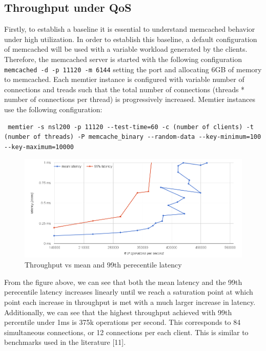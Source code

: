 \subsection{Throughput under QoS}
Firstly, to establish a baseline it is essential to understand memcached behavior under high utilization. In order to establish this baseline, a default configuration of memcached will be used with a variable workload generated by the clients. Therefore, the memcached server is started with the following configuration \texttt{memcached -d -p 11120 -m 6144} setting the port and allocating 6GB of memory to memcached. Each memtier instance is configured with variable number of connections and treads such that the total number of connections (threads * number of connections per thread) is progressively increased. Memtier instances use the following configuration:
\begin{verbatim} memtier -s nsl200 -p 11120 --test-time=60 -c (number of clients) -t (number of threads) -P memcache_binary --random-data --key-minimum=100 --key-maximum=10000 \end{verbatim}

\begin{figure}[h]
    \includegraphics[width=\textwidth]{./res/5_baseline_latency_vs_ops.png}
    \caption{Throughput vs mean and 99th perecentile latency}
    \label{fig:memcached-default-latency-vs-ops}
\end{figure}

From the figure above, we can see that both the mean latency and the 99th perecentile latency increases linearly until we reach a saturation point at which point each increase in throughput is met with a much larger increase in latency. Additionally, we can see that the highest throughput achieved with 99th percentile under 1ms is 375k operations per second. This corresponds to 84 simultaneous connections, or 12 connections per each client. This is similar to benchmarks used in the literature [11].

